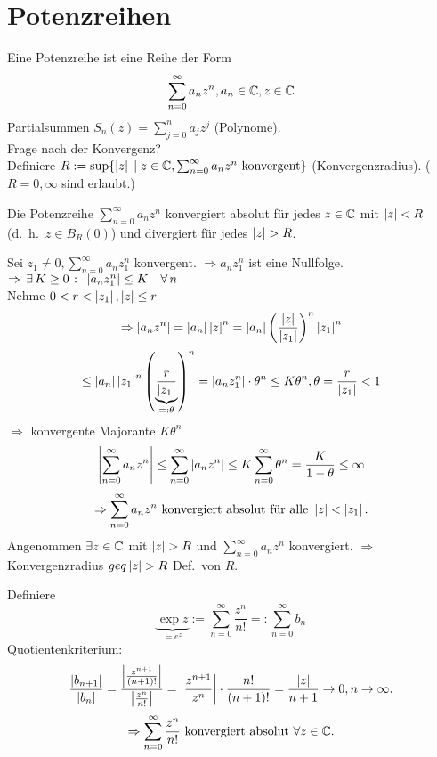\documentclass[../ana1.tex]{subfiles}
\begin{document}
\setcounter{section}{13}
\section{Potenzreihen}

\begin{prosa}
    Eine Potenzreihe ist eine Reihe der Form
    \[ \sum_{n=0}^\infty a_n z^n, a_n \in\mathbb{C}, z \in\mathbb{C} \] 
    Partialsummen \( S_n(z) = \sum_{j=0}^n a_j z^j \) (Polynome).\\
    Frage nach der Konvergenz?\\
    Definiere \( R:= \sup \{ \left|z\right| \;\vert \; z\in\mathbb{C}, \sum_{n=0}^\infty a_n z^n \text{ konvergent} \} \)
    (Konvergenzradius). (\( R = 0, \infty \) sind erlaubt.)
\end{prosa}
\begin{lem}
    Die Potenzreihe \( \sum_{n=0}^\infty a_n z^n \) konvergiert absolut für jedes \( z\in\mathbb{C} \) mit \( \left|z\right| < R \) (d.\ h.\  \( z\in B_R(0) \)) und divergiert für jedes \( \left|z\right| > R \).
\end{lem}
\begin{bew}
    Sei \( z_1 \neq 0, \sum_{n=0}^\infty a_n z_1^n \) konvergent.
    \( \Rightarrow a_n z_1^n \) ist eine Nullfolge.
    \( \Rightarrow \, \exists \, K \geq 0 \; \colon \; \left|a_n z_1^n\right| \leq K \quad \forall \, n \) \\
    Nehme \( 0<r < \left|z_1\right|, \left|z\right| \leq r \)
    \[ \Rightarrow \left|a_n z^n\right| = \left|a_n\right| \left|z\right|^n = \left|a_n\right| { \left( \frac{\left|z\right|}{\left|z_1\right|} \right) }^n \left|z_1\right|^n \]
    \[ \leq \left|a_n\right|\left|z_1\right|^n {\left( \underbrace{\frac{r}{\left|z_1\right|}}_{=: \theta} \right)}^n = \left|a_n z_1^n\right| \cdot \theta^n \leq K \theta^n, \theta = \frac{r}{\left|z_1\right|} < 1 \]
    \( \Rightarrow \) konvergente Majorante \( K \theta^n \) \\
    \[ \left| \sum_{n=0}^\infty a_n z^n \right| \leq \sum_{n=0}^\infty \left| a_n z^n \right| \leq K \sum_{n=0}^\infty \theta^n = \frac{K}{1 - \theta} \leq \infty \]
    \[ \Rightarrow \sum_{n=0}^\infty a_n z^n \text{ konvergiert absolut für alle } \left|z\right| < \left|z_1\right|. \]
    Angenommen \( \exists z\in\mathbb{C} \) mit \( \left|z\right| > R \) und \( \sum_{n=0}^\infty a_n z^n \) konvergiert.
    \( \Rightarrow \) Konvergenzradius \(geq \left|z\right| > R \) \Lightning{} Def.\ von \(R\).
\end{bew}
\begin{bsp}
    Definiere
    \[ \underbrace{\exp z}_{=e^z} := \sum_{n=0}^\infty \frac{z^n}{n!} =: \sum_{n=0}^\infty b_n \]
    Quotientenkriterium:
    \[ \frac{\left|b_{n+1}\right|}{\left|b_n\right|} = \frac{ \left| \frac{ z^{n+1} }{ (n+1)! } \right| }{ \left| \frac{ z^n }{ n! } \right| } = \left| \frac{ z^{n+1} }{ z^n } \right| \cdot \frac{ n! }{ (n+1)! } = \frac{\left|z\right|}{n+1} \rightarrow 0, n\rightarrow\infty. \]
    \[ \Rightarrow \sum_{n=0}^\infty \frac{z^n}{n!} \text{ konvergiert absolut } \forall z\in\mathbb{C}. \]
\end{bsp}
\end{document}
